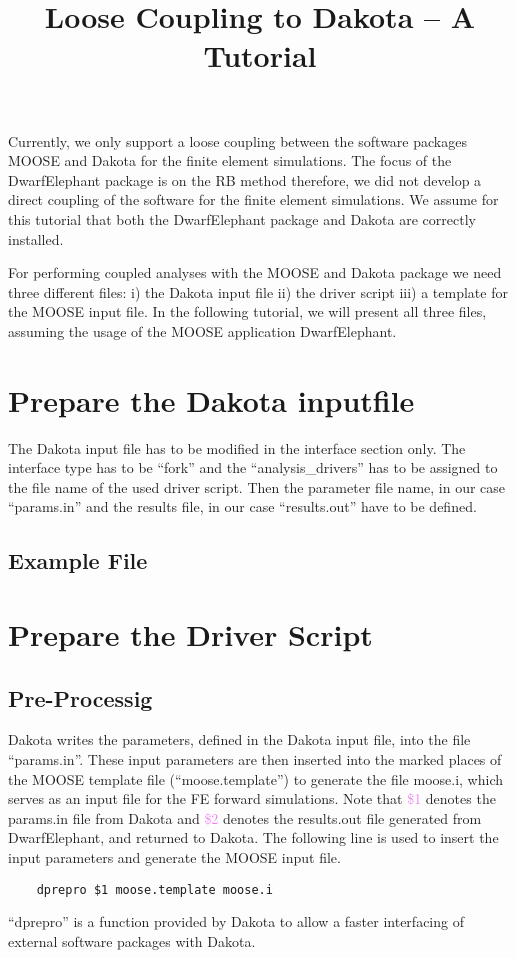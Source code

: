 \documentclass[11pt, a4paper, DIV=14]{scrartcl}
\begin{document}
\title{Loose Coupling to Dakota -- A Tutorial}

\maketitle

Currently, we only support a loose coupling between the software packages MOOSE \cite{moose-web-page, tonks_et_al} and Dakota \cite{adams_et_al} for the finite element simulations. The focus of the DwarfElephant package is on the RB method therefore, we did not develop a direct coupling of the software for the finite element simulations. We assume for this tutorial that both the DwarfElephant package and Dakota are correctly installed. 

For performing coupled analyses with the MOOSE and Dakota package we need three different files: i) the Dakota input file ii) the driver script iii) a template for the MOOSE input file. In the following tutorial, we will present all three files, assuming the usage of the MOOSE application DwarfElephant.

\section{Prepare the Dakota inputfile}
The Dakota input file has to be modified in the interface section only. The interface type has to be ``fork'' and the ``analysis\_drivers'' has to be assigned to the file name of the used driver script. Then the parameter file name, in our case ``params.in'' and the results file, in our case ``results.out'' have to be defined.

\subsection{Example File}


\section{Prepare the Driver Script}
\subsection{Pre-Processig}
Dakota writes the parameters, defined in the Dakota input file, into the file ``params.in''. These input parameters are then inserted into the marked places of the MOOSE template file (``moose.template'') to generate the file moose.i, which serves as an input file for the FE forward simulations. Note that \textcolor{violet}
{\$1} denotes the params.in file from Dakota and \textcolor{violet}{\$2} denotes the results.out file generated from DwarfElephant, and returned to Dakota. The following line is used to insert the input parameters and generate the MOOSE input file.
\begin{lstlisting}
    dprepro $1 moose.template moose.i
\end{lstlisting}
``dprepro'' is a function provided by Dakota to allow a faster interfacing of external software packages with Dakota.
\end{document}
